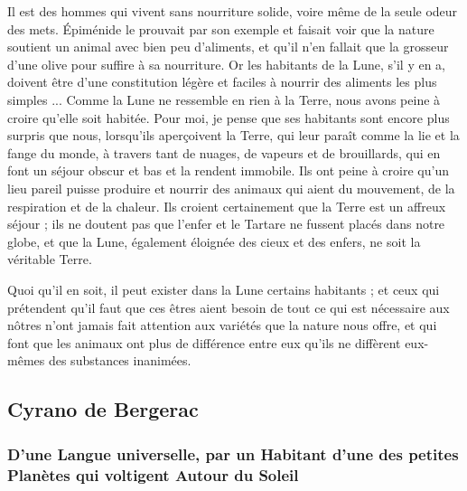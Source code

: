 \documentclass[a4paper, 11pt, oneside, landscape]{article}
\begin{document}
Il est des hommes qui vivent sans nourriture solide, voire même de la seule odeur des mets. Épiménide le prouvait par son exemple et faisait voir que la nature soutient un animal avec bien peu d'aliments, et qu'il n'en fallait que la grosseur d'une olive pour suffire à sa nourriture. Or les habitants de la Lune, s'il y en a, doivent être d'une constitution légère et faciles à nourrir des aliments les plus simples ... Comme la Lune ne ressemble en rien à la Terre, nous avons peine à croire qu'elle soit habitée. Pour moi, je pense que ses habitants sont encore plus surpris que nous, lorsqu'ils aperçoivent la Terre, qui leur paraît comme la lie et la fange du monde, à travers tant de nuages, de vapeurs et de brouillards, qui en font un séjour obscur et bas et la rendent immobile. Ils ont peine à croire qu'un lieu pareil puisse produire et nourrir des animaux qui aient du mouvement, de la respiration et de la chaleur. Ils croient certainement que la Terre est un affreux séjour ; ils ne doutent pas que l'enfer et le Tartare ne fussent placés dans notre globe, et que la Lune, également éloignée des cieux et des enfers, ne soit la véritable Terre.

Quoi qu'il en soit, il peut exister dans la Lune certains habitants ; et ceux qui prétendent qu'il faut que ces êtres aient besoin de tout ce qui est nécessaire aux nôtres n'ont jamais fait attention aux variétés que la nature nous offre, et qui font que les animaux ont plus de différence entre eux qu'ils ne diffèrent eux-mêmes des substances inanimées.
\clearpage
\subsection{Cyrano de Bergerac}
\subsubsection{D'une Langue universelle, par un Habitant d'une des petites Planètes qui voltigent Autour du Soleil}
\end{document}
